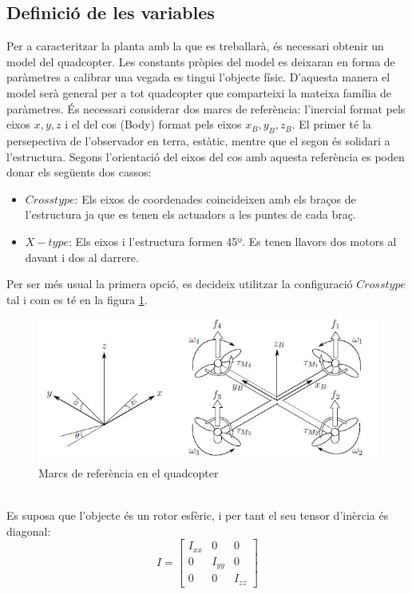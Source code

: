 \documentclass[twoside]{article}
\begin{document}
\subsection{Definició de les variables}
Per a caracteritzar la planta amb la que es treballarà, és necessari obtenir un model del quadcopter. Les constants pròpies del model es deixaran en forma de paràmetres a calibrar una vegada es tingui l'objecte físic. D'aquesta manera el model serà general per a tot quadcopter que comparteixi la mateixa família de paràmetres.
És necessari considerar dos marcs de referència: l'inercial format pels eixos $x,y,z$ i el del cos (Body) format pels eixos $x_B,y_B,z_B$. El primer té la persepectiva de l'observador en terra, estàtic, mentre que el segon és solidari a l'estructura. Segons l'orientació del eixos del cos amb aquesta referència es poden donar els següents dos cassos:
\begin{itemize}
\item $Cross type$: Els eixos de coordenades coincideixen amb els braços de l'estructura ja que es tenen els actuadors a les puntes de cada braç.
\item $X-type$: Els eixos i l'estructura formen 45º. Es tenen llavors dos motors al davant i dos al darrere.
\end{itemize} 
Per ser més usual la primera opció, es decideix utilitzar la configuració $Cross type$ tal i com es té en la figura \ref{RefQuad}.
\begin{figure}[h!]
\centering
\includegraphics[scale=0.5]{images/quad.jpg}
\caption{Marcs de referència en el quadcopter}
\label{RefQuad}
\end{figure}\\
Es suposa que l'objecte és un rotor esfèric, i per tant el seu tensor d'inèrcia és diagonal:
\begin{equation}I=\left[ \begin{array}{ccc}
I_{xx} & 0 & 0 \\
0 & I_{yy} & 0 \\
0 & 0 & I_{zz} 
\end{array} \right] \end{equation}
\end{document}
